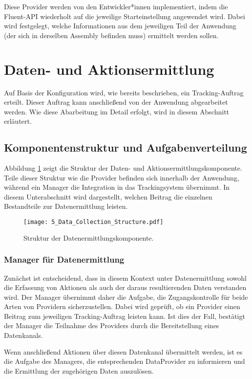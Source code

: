 Diese Provider werden von den Entwickler*innen implementiert, indem die Fluent-API wiederholt auf die jeweilige Starteinstellung angewendet wird. Dabei wird festgelegt, welche Informationen aus dem jeweiligen Teil der Anwendung (der sich in derselben Assembly befinden muss) ermittelt werden sollen.

\section{Daten- und Aktionsermittlung}
\label{sec:data_collection_concept}
Auf Basis der Konfiguration wird, wie bereits beschrieben, ein Tracking-Auftrag erteilt. Dieser Auftrag kann anschließend von der Anwendung abgearbeitet werden. Wie diese Abarbeitung im Detail erfolgt, wird in diesem Abschnitt erläutert.

\subsection{Komponentenstruktur und Aufgabenverteilung}
\label{subsec:data_collection_components}
Abbildung \ref{fig:structure_data_collection} zeigt die Struktur der Daten- und Aktionsermittlungskomponente. Teile dieser Struktur wie die Provider befinden sich innerhalb der Anwendung, während ein Manager die Integration in das Trackingsystem übernimmt. In diesem Unterabschnitt wird dargestellt, welchen Beitrag die einzelnen Bestandteile zur Datenermittlung leisten.

\begin{figure}[H]
\centering
\texttt{[image: 5\_Data\_Collection\_Structure.pdf]}
\caption{Struktur der Datenermittlungskomponente.}
\label{fig:structure_data_collection}
\end{figure}

\subsubsection{Manager für Datenermittlung}
Zunächst ist entscheidend, dass in diesem Kontext unter Datenermittlung sowohl die Erfassung von Aktionen als auch der daraus resultierenden Daten verstanden wird. Der Manager übernimmt daher die Aufgabe, die Zugangskontrolle für beide Arten von Providern sicherzustellen. Dabei wird geprüft, ob ein Provider einen Beitrag zum jeweiligen Tracking-Auftrag leisten kann. Ist dies der Fall, bestätigt der Manager die Teilnahme des Providers durch die Bereitstellung eines Datenkanals.

Wenn anschließend Aktionen über diesen Datenkanal übermittelt werden, ist es die Aufgabe des Managers, die entsprechenden DataProvider zu informieren und die Ermittlung der zugehörigen Daten auszulösen.

